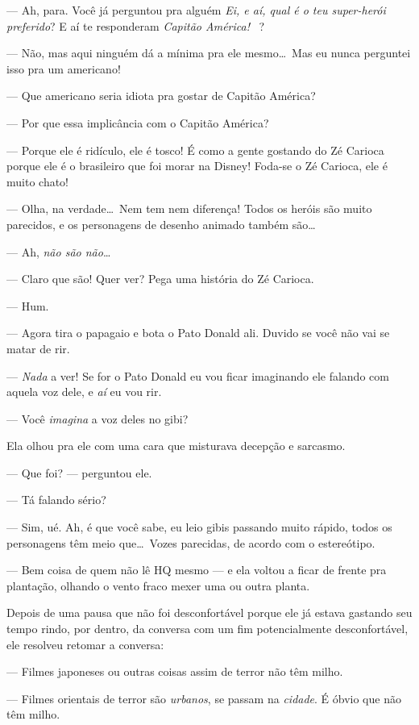 --- Ah, para. Você já perguntou pra alguém \emph{Ei, e aí, qual é o teu super-herói preferido}? E aí te responderam \emph{Capitão América!} \ ?

--- Não, mas aqui ninguém dá a mínima pra ele mesmo\ldots \ Mas eu nunca perguntei isso pra um americano!

--- Que americano seria idiota pra gostar de Capitão América?

--- Por que essa implicância com o Capitão América?

--- Porque ele é ridículo, ele é tosco! É como a gente gostando do Zé Carioca porque ele é o brasileiro que foi morar na Disney! Foda-se o Zé Carioca, ele é muito chato!

--- Olha, na verdade\ldots \ Nem tem nem diferença! Todos os heróis são muito parecidos, e os personagens de desenho animado também são\ldots

--- Ah, \emph{não são não}\ldots

--- Claro que são! Quer ver? Pega uma história do Zé Carioca.

--- Hum.

--- Agora tira o papagaio e bota o Pato Donald ali. Duvido se você não vai se matar de rir.

--- \emph{Nada} a ver! Se for o Pato Donald eu vou ficar imaginando ele falando com aquela voz dele, e \emph{aí} eu vou rir.

--- Você \emph{imagina} a voz deles no gibi?

Ela olhou pra ele com uma cara que misturava decepção e sarcasmo.

--- Que foi? --- perguntou ele.

--- Tá falando sério?

--- Sim, ué. Ah, é que você sabe, eu leio gibis passando muito rápido, todos os personagens têm meio que\ldots \ Vozes parecidas, de acordo com o estereótipo.

--- Bem coisa de quem não lê HQ mesmo --- e ela voltou a ficar de frente pra plantação, olhando o vento fraco mexer uma ou outra planta.

Depois de uma pausa que não foi desconfortável porque ele já estava gastando seu tempo rindo, por dentro, da conversa com um fim potencialmente desconfortável, ele resolveu retomar a conversa:

--- Filmes japoneses ou outras coisas assim de terror não têm milho.

--- Filmes orientais de terror são \emph{urbanos}, se passam na \emph{cidade}. É óbvio que não têm milho.

